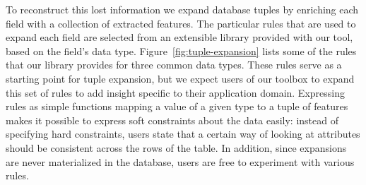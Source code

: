 To reconstruct this lost information we expand database tuples by enriching each field with a collection of extracted features. The particular rules that are used to expand each field are selected from an extensible library provided with our tool, based on the field's data type. Figure~\ref{fig:tuple-expansion} lists some of the rules that our library provides for three common data types. These rules serve as a starting point for tuple expansion, but we expect users of our toolbox to expand this set of rules to add insight specific to their application domain. Expressing rules as simple functions mapping a value of a given type to a tuple of features makes it possible to express soft constraints about the data easily: instead of specifying hard constraints, users state that a certain way of looking at attributes should be consistent across the rows of the table. In addition, since expansions are never materialized in the database, users are free to experiment with various rules.

\newenvironment{stackedlines}{\renewcommand{\arraystretch}{1.2}\begin{array}[b]{@{}l@{\quad}l@{}}}{\end{array}}
\newcommand{\sigrule}[1]{\mbox{\texttt{\spaceskip=0.1em{#1}}}}

